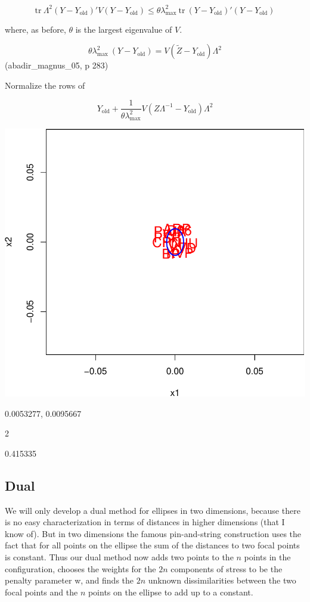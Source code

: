 \documentclass[
  12pt,
  letterpaper,
  DIV=11,
  numbers=noendperiod]{scrreprt}
\theoremstyle{remark}
\begin{document}
\[
\text{tr}\ \Lambda^2(Y-Y_{\text{old}})'V(Y-Y_{\text{old}})\leq
\theta\lambda_{\text{max}}^2\ \text{tr}\ (Y-Y_{\text{old}})'(Y-Y_{\text{old}})
\]

where, as before, \(\theta\) is the largest eigenvalue of \(V\).

\[
\theta\lambda_{\text{max}}^2\ (Y-Y_{\text{old}})=V(\tilde Z - Y_{\text{old}})\Lambda^2
\] (abadir\_magnus\_05, p 283)

Normalize the rows of

\[
Y_{\text{old}}+\frac{1}{\theta\lambda_{\text{max}}^2}V(Z\Lambda^{-1}-Y_{\text{old}})\Lambda^2
\]

\begin{center}
\includegraphics{constrained_files/figure-pdf/ekellikpnts-1.pdf}
\end{center}

0.0053277, 0.0095667

2

0.415335

\subsection{Dual}\label{ellidual}

We will only develop a dual method for ellipses in two dimensions,
because there is no easy characterization in terms of distances in
higher dimensions (that I know of). But in two dimensions the famous
pin-and-string construction uses the fact that for all points on the
ellipse the sum of the distances to two focal points is constant. Thus
our dual method now adds two points to the \(n\) points in the
configuration, chooses the weights for the \(2n\) components of stress
to be the penalty parameter w, and finds the \(2n\) unknown
dissimilarities between the two focal points and the \(n\) points on the
ellipse to add up to a constant.
\end{document}
